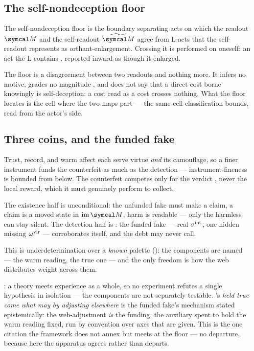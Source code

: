 \documentclass[../main]{subfiles}
\begin{document}
\subsection{The self-nondeception floor}
\label{subsec:decep:floor}
%
\begin{definition}
  The self-nondeception floor is the boundary separating acts on which the readout
  $\readout$ and the self-readout $\falsereadout$ agree from L-acts that the
  self-readout represents as orthant-enlargement. Crossing it is 
  performed on oneself: an act the L contains , reported inward as
  though it enlarged.
\end{definition}

The floor is a disagreement between two readouts and nothing more. It infers no motive,
grades no magnitude , and does not say that a direct cost
borne knowingly is self-deception: a cost read as a cost crosses nothing. What the floor
locates is the cell where the two maps part --- the same cell-classification
 bounds, read from the actor's side.

\subsection{Three coins, and the funded fake}
\label{subsec:decep:coins}
%
Trust, record, and warm affect each serve virtue \emph{and} its camouflage, so a finer
instrument funds the counterfeit as much as the detection --- instrument-fineness is bounded
from below. The counterfeit competes only for the verdict , never the local
reward, which it must genuinely perform to collect.

The existence half is unconditional: the unfunded fake must make a claim, a claim is a moved
state in $\mathrm{im}\,\readout$, harm is readable --- only the harmless can stay silent. The
detection half is : the funded fake --- real $\sigma\sp{\mathrm{int}}$, one
hidden missing $\omega\sp{\mathrm{vir}}$ --- corroborates itself, and the debt may never call.

This is underdetermination over a \emph{known} palette  (): the
components are named --- the warm reading, the true one --- and the only freedom is how the
web distributes weight across them.

\begin{epist}[label=epist:duhem, title={Underdetermination over a known palette},
  ref=op:recess]
  \textcite{foil:duhem}: a theory meets experience as a whole, so no experiment refutes a
  single hypothesis in isolation --- the components are not separately testable.
  \textcite{foil:quine}'s \emph{held true come what may by adjusting elsewhere} is the funded
  fake's mechanism stated epistemically: the web-adjustment \emph{is} the funding, the
  auxiliary spent to hold the warm reading fixed,  run by convention over axes
  that are given. This is the one citation the framework does not annex but meets at the floor
  --- no departure, because here the apparatus agrees rather than departs.
\end{epist}
\end{document}

